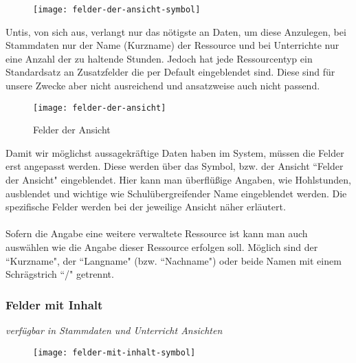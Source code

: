 \begin{wrapfigure}{r}{.05\textwidth}
	\vspace{-50pt}
	\texttt{[image: felder-der-ansicht-symbol]}
	\vspace{-35pt}
\end{wrapfigure}

\noindent
Untis, von sich aus, verlangt nur das nötigste an Daten, um diese Anzulegen, bei Stammdaten nur der Name (Kurzname) der Ressource und bei Unterrichte nur eine Anzahl der zu haltende Stunden. Jedoch hat jede Ressourcentyp ein Standardsatz an Zusatzfelder die per Default eingeblendet sind. Diese sind für unsere Zwecke aber nicht ausreichend und ansatzweise auch nicht passend.

\begin{wrapfigure}{r}{0.4\textwidth}
	\texttt{[image: felder-der-ansicht]}
	\vspace{-15pt}
	\caption{Felder der Ansicht}
	\label{fig:felder-der-ansicht}
\end{wrapfigure}

\noindent
Damit wir möglichst aussagekräftige Daten haben im System, müssen die Felder erst angepasst werden. Diese werden über das Symbol, bzw. der Ansicht ``Felder der Ansicht" eingeblendet. Hier kann man überflüßige Angaben, wie Hohlstunden, ausblendet und wichtige wie Schulübergreifender Name eingeblendet werden. Die spezifische Felder werden bei der jeweilige Ansicht näher erläutert.\\
\\
Sofern die Angabe eine weitere verwaltete Ressource ist kann man auch auswählen wie die Angabe dieser Ressource erfolgen soll. Möglich sind der ``Kurzname", der ``Langname" (bzw. ``Nachname") oder beide Namen mit einem Schrägstrich ``/" getrennt.

\subsubsection{Felder mit Inhalt}
{\small\textit{verfügbar in Stammdaten und Unterricht Ansichten\\}\par}

\begin{wrapfigure}{r}{.05\textwidth}
	\vspace{-50pt}
	\texttt{[image: felder-mit-inhalt-symbol]}
	\vspace{-35pt}
\end{wrapfigure}

